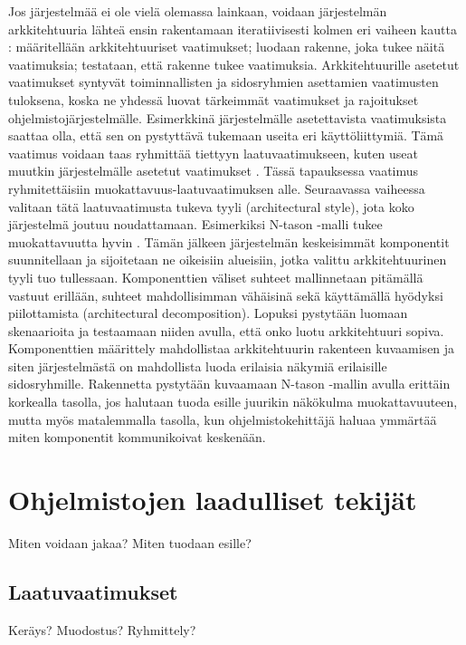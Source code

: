 \documentclass[finnish]{tktltiki2}
\theoremstyle{definition}
\theoremstyle{remark}
\begin{document}
Jos järjestelmää ei ole vielä olemassa lainkaan, voidaan järjestelmän arkkitehtuuria lähteä ensin rakentamaan iteratiivisesti kolmen eri vaiheen kautta \citep[s. 97-115]{gorton_understanding_2011}: määritellään arkkitehtuuriset vaatimukset; luodaan rakenne, joka tukee näitä vaatimuksia; testataan, että rakenne tukee vaatimuksia. Arkkitehtuurille asetetut vaatimukset syntyvät toiminnallisten ja sidosryhmien asettamien vaatimusten tuloksena, koska ne yhdessä luovat tärkeimmät vaatimukset ja rajoitukset ohjelmistojärjestelmälle. Esimerkkinä järjestelmälle asetettavista vaatimuksista saattaa olla, että sen on pystyttävä tukemaan useita eri käyttöliittymiä. Tämä vaatimus voidaan taas ryhmittää tiettyyn laatuvaatimukseen, kuten useat muutkin järjestelmälle asetetut vaatimukset \citep[s. 117]{Ran:1998:ASV:288408.288438}. Tässä tapauksessa vaatimus ryhmitettäisiin muokattavuus-laatuvaatimuksen alle. Seuraavassa vaiheessa valitaan tätä laatuvaatimusta tukeva tyyli (architectural style), jota koko järjestelmä joutuu noudattamaan. Esimerkiksi N-tason -malli tukee muokattavuutta hyvin \citep[s. 103]{gorton_understanding_2011}. Tämän jälkeen järjestelmän keskeisimmät komponentit suunnitellaan ja sijoitetaan ne oikeisiin alueisiin, jotka valittu arkkitehtuurinen tyyli tuo tullessaan. Komponenttien väliset suhteet mallinnetaan pitämällä vastuut erillään, suhteet mahdollisimman vähäisinä sekä käyttämällä hyödyksi piilottamista (architectural decomposition). Lopuksi pystytään luomaan skenaarioita ja testaamaan niiden avulla, että onko luotu arkkitehtuuri sopiva. Komponenttien määrittely mahdollistaa arkkitehtuurin rakenteen kuvaamisen ja siten järjestelmästä on mahdollista luoda erilaisia näkymiä erilaisille sidosryhmille. Rakennetta pystytään kuvaamaan N-tason -mallin avulla erittäin korkealla tasolla, jos halutaan tuoda esille juurikin näkökulma muokattavuuteen, mutta myös matalemmalla tasolla, kun ohjelmistokehittäjä haluaa ymmärtää miten komponentit kommunikoivat keskenään.

\section{Ohjelmistojen laadulliset tekijät}

Miten voidaan jakaa? Miten tuodaan esille? 

\subsection{Laatuvaatimukset}
Keräys? Muodostus? Ryhmittely?
\end{document}
